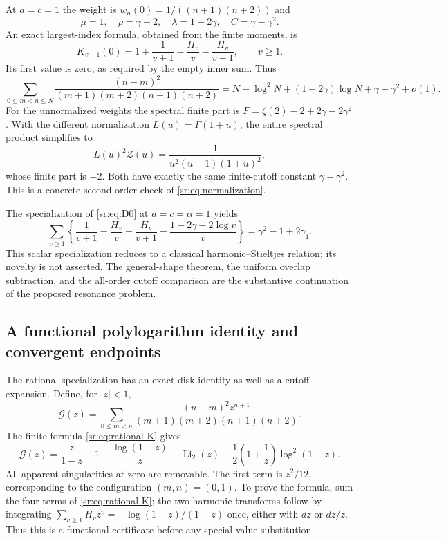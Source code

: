At $a=c=1$ the weight is $w_n(0)=1/((n+1)(n+2))$ and
\[
 \mu=1,\quad \rho=\gamma-2,\quad \lambda=1-2\gamma,
 \quad C=\gamma-\gamma^2.
\]
An exact largest-index formula, obtained from the finite moments, is
\begin{equation}\label{sr:eq:rational-K}
 K_{v-1}(0)=1+\frac1{v+1}-\frac{H_v}{v}-\frac{H_v}{v+1},
 \qquad v\ge1.
\end{equation}
Its first value is zero, as required by the empty inner sum. Thus
\begin{equation}\label{sr:eq:integer-cutoff}
 \sum_{0\le m<n\le N}\frac{(n-m)^2}{(m+1)(m+2)(n+1)(n+2)}
 =N-\log^2N+(1-2\gamma)\log N+\gamma-\gamma^2+o(1).
\end{equation}
For the unnormalized weights the spectral finite part is
$F=\zeta(2)-2+2\gamma-2\gamma^2$. With the different normalization
$L(u)=\Gamma(1+u)$, the entire spectral product simplifies to
\[
 L(u)^2\mathcal Z(u)=\frac1{u^2(u-1)(1+u)^2},
\]
whose finite part is $-2$. Both have exactly the same finite-cutoff
constant $\gamma-\gamma^2$. This is a concrete second-order check
of \eqref{sr:eq:normalization}.

The specialization of \eqref{sr:eq:D0} at $a=c=\alpha=1$ yields
\[
 \sum_{v\ge1}\left\{
 \frac1{v+1}-\frac{H_v}{v}-\frac{H_v}{v+1}
 -\frac{1-2\gamma-2\log v}{v}\right\}
 =\gamma^2-1+2\gamma_1.
\]
This scalar specialization reduces to a classical harmonic--Stieltjes
relation; its novelty is not asserted. The general-shape theorem, the
uniform overlap subtraction, and the all-order cutoff comparison are
the substantive continuation of the proposed resonance problem.

\subsection{A functional polylogarithm identity and convergent endpoints}
The rational specialization has an exact disk identity as well as a
cutoff expansion. Define, for $|z|<1$,
\[
 \mathcal G(z)=\sum_{0\le m<n}
 \frac{(n-m)^2z^{n+1}}{(m+1)(m+2)(n+1)(n+2)}.
\]
The finite formula \eqref{sr:eq:rational-K} gives
\begin{equation}\label{sr:eq:G-polylog}
 \boxed{\displaystyle
 \mathcal G(z)=\frac z{1-z}-1-\frac{\log(1-z)}z
 -\operatorname{Li}_2(z)-\frac12\left(1+\frac1z\right)\log^2(1-z).}
\end{equation}
All apparent singularities at zero are removable. The first term is
$z^2/12$, corresponding to the configuration $(m,n)=(0,1)$.
To prove the formula, sum the four terms of
\eqref{sr:eq:rational-K}; the two harmonic transforms follow by
integrating $\sum_{v\ge1}H_vz^v=-\log(1-z)/(1-z)$ once, either with
$dz$ or $dz/z$. Thus this is a functional certificate before any
special-value substitution.

